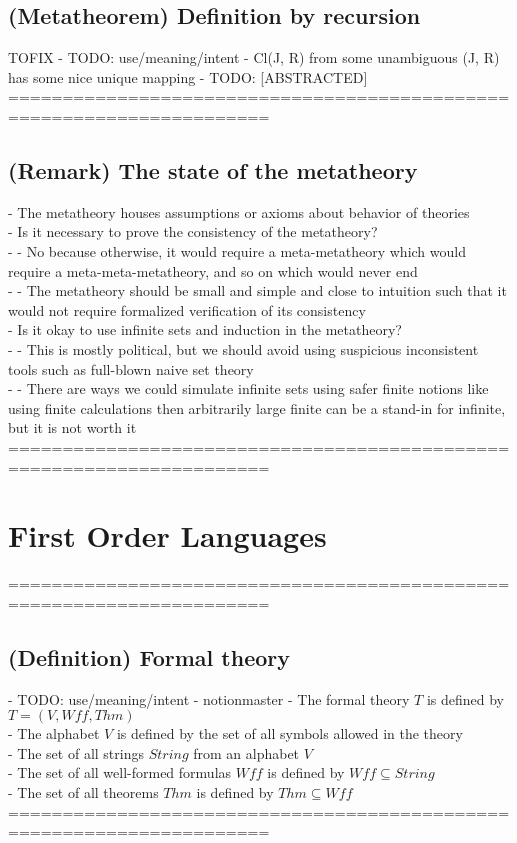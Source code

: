 \documentclass{article}
\begin{document}
\subsection{(Metatheorem) Definition by recursion} TOFIX
	- TODO: use/meaning/intent - Cl(J, R) from some unambiguous (J, R) has some nice unique mapping
	- TODO: [ABSTRACTED]
	======================================================================
\subsection{(Remark) The state of the metatheory}
	- The metatheory houses assumptions or axioms about behavior of theories \\
	- Is it necessary to prove the consistency of the metatheory? \\
		- - No because otherwise, it would require a meta-metatheory which would require a meta-meta-metatheory, and so on which would never end \\
		- - The metatheory should be small and simple and close to intuition such that it would not require formalized verification of its consistency \\
	- Is it okay to use infinite sets and induction in the metatheory? \\
		- - This is mostly political, but we should avoid using suspicious inconsistent tools such as full-blown naive set theory \\
		- - There are ways we could simulate infinite sets using safer finite notions like using finite calculations then arbitrarily large finite can be a stand-in for infinite, but it is not worth it \\
	======================================================================

\section{First Order Languages}
	======================================================================
\subsection{(Definition) Formal theory}
	- TODO: use/meaning/intent - notionmaster
	- The formal theory $T$ is defined by $T = (V, Wff, Thm)$ \\ %
	- The alphabet $V$ is defined by the set of all symbols allowed in the theory \\
	- The set of all strings $String$ from an alphabet $V$ \\
	- The set of all well-formed formulas $Wff$ is defined by $Wff \subseteq String$ \\
	- The set of all theorems $Thm$ is defined by $Thm \subseteq Wff$ \\
	======================================================================
\end{document}
